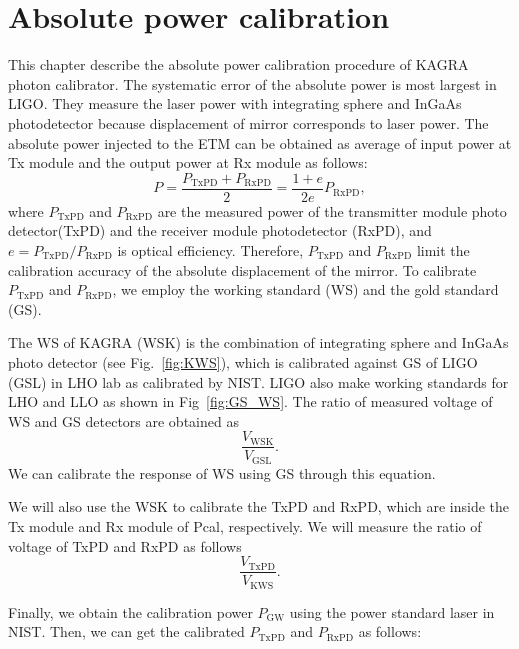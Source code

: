 
\chapter{Absolute power calibration} %
\label{Chapter5} %
This chapter describe the absolute power calibration procedure of KAGRA photon calibrator.
The systematic error of the absolute power is most largest in LIGO.
They measure the laser power with integrating sphere and InGaAs photodetector because displacement of mirror corresponds to laser power. 
The absolute power injected to the ETM can be obtained as average of input power at Tx module and the output power at Rx module as follows:
\begin{equation}
P=\frac{P_{\mathrm{TxPD}}+P_{\mathrm{RxPD}}}{2}=\frac{1+e}{2e}P_{\mathrm{RxPD}},
\end{equation}
where $P_{\mathrm{TxPD}}$ and $P_{\mathrm{RxPD}}$ are the measured power of the transmitter module photo detector(TxPD) and the receiver module photodetector (RxPD), and $e=P_{\mathrm{TxPD}}/P_{\mathrm{RxPD}}$ is optical efficiency.
Therefore, $P_{\mathrm{TxPD}}$ and $P_{\mathrm{RxPD}}$ limit the calibration accuracy of the absolute displacement of the mirror.
To calibrate $P_{\mathrm{TxPD}}$ and $P_{\mathrm{RxPD}}$, we employ the working standard (WS) and the gold standard (GS). 

The WS of KAGRA (WSK) is the combination of integrating sphere and InGaAs photo detector (see Fig.~\ref{fig:KWS}), which is calibrated against GS of LIGO (GSL) in LHO lab as calibrated by NIST. LIGO also make working standards for LHO and LLO as shown in Fig~\ref{fig:GS_WS}.
The ratio of measured voltage of WS and GS detectors are obtained as
\begin{equation}
\frac{V_{\mathrm{WSK}}}{V_{\mathrm{GSL}}}.
\end{equation}
We can calibrate the response of WS using GS through this equation.

We will also use the WSK to calibrate the TxPD and RxPD, which are inside the Tx module and Rx module of Pcal, respectively. We will measure the ratio of voltage of TxPD and RxPD as follows
\begin{equation}
\frac{V_{\mathrm{TxPD}}}{V_{\mathrm{KWS}}}.
\end{equation}

Finally,  we obtain the calibration power $P_{\mathrm{GW}}$ using the power standard laser in NIST.
Then, we can get the calibrated $P_{\mathrm{TxPD}}$ and $P_{\mathrm{RxPD}}$ as follows:

